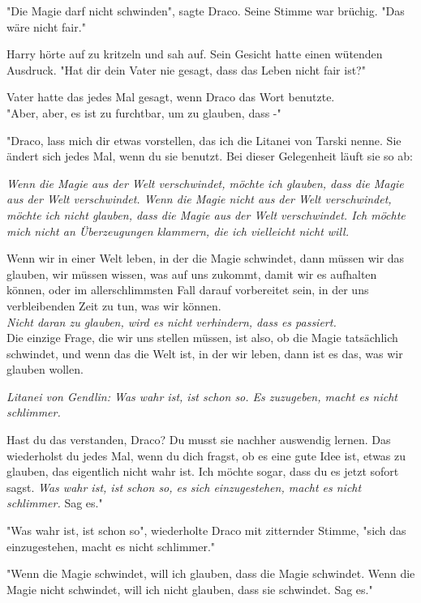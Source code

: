 {"Die Magie darf nicht schwinden", sagte Draco. Seine Stimme war brüchig. "Das wäre nicht fair."

Harry hörte auf zu kritzeln und sah auf. Sein Gesicht hatte einen wütenden Ausdruck. "Hat dir dein Vater nie gesagt, dass das Leben nicht fair ist?"

Vater hatte das jedes Mal gesagt, wenn Draco das Wort benutzte.\\ "Aber, aber, es ist zu furchtbar, um zu glauben, dass -"

"Draco, lass mich dir etwas vorstellen, das ich die Litanei von Tarski nenne. Sie ändert sich jedes Mal, wenn du sie benutzt. Bei dieser Gelegenheit läuft sie so ab:

\emph{Wenn die Magie aus der Welt verschwindet, möchte ich glauben, dass die Magie aus der Welt verschwindet. Wenn die Magie nicht aus der Welt verschwindet, möchte ich nicht glauben, dass die Magie aus der Welt verschwindet. Ich möchte mich nicht an Überzeugungen klammern, die ich vielleicht nicht will.}

Wenn wir in einer Welt leben, in der die Magie schwindet, dann müssen wir das glauben, wir müssen wissen, was auf uns zukommt, damit wir es aufhalten können, oder im allerschlimmsten Fall darauf vorbereitet sein, in der uns verbleibenden Zeit zu tun, was wir können.\\ \emph{Nicht daran zu glauben, wird es nicht verhindern, dass es passiert.}\\ Die einzige Frage, die wir uns stellen müssen, ist also, ob die Magie tatsächlich schwindet, und wenn das die Welt ist, in der wir leben, dann ist es das, was wir glauben wollen.

\emph{Litanei von Gendlin: Was wahr ist, ist schon so. Es zuzugeben, macht es nicht schlimmer.}

Hast du das verstanden, Draco? Du musst sie nachher auswendig lernen. Das wiederholst du jedes Mal, wenn du dich fragst, ob es eine gute Idee ist, etwas zu glauben, das eigentlich nicht wahr ist. Ich möchte sogar, dass du es jetzt sofort sagst. \emph{Was wahr ist, ist schon so, es sich einzugestehen, macht es nicht schlimmer.} Sag es."

"Was wahr ist, ist schon so", wiederholte Draco mit zitternder Stimme, "sich das einzugestehen, macht es nicht schlimmer."

"Wenn die Magie schwindet, will ich glauben, dass die Magie schwindet. Wenn die Magie nicht schwindet, will ich nicht glauben, dass sie schwindet. Sag es."

}
